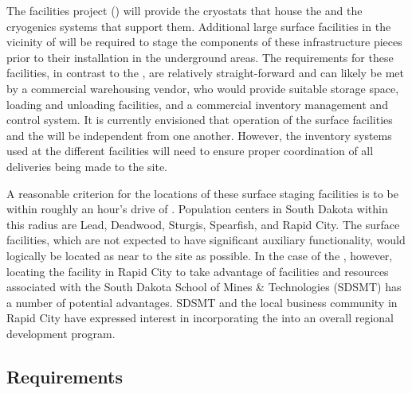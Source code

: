  The facilities project () will provide the cryostats that 
 house the  and the cryogenics
systems that support them.  Additional large surface facilities in the vicinity
of \surf will be required to stage the components of these
infrastructure pieces prior to their installation in the underground
areas.  The requirements for these facilities, in contrast to the
, are relatively straight-forward and can likely be met by
a commercial warehousing vendor, who would provide suitable storage
space, loading and unloading facilities, and a commercial inventory
management and control system.  It is currently envisioned that
operation of the  surface facilities and the 
 will be independent from one another.  However, the
inventory systems used at the different facilities will need to %
ensure proper coordination of all
deliveries being made to the \surf site.

A reasonable criterion for the locations of these surface staging
facilities is to be within roughly an hour's drive of \surf.
Population centers in South Dakota within this radius are Lead,
Deadwood, Sturgis, Spearfish, and Rapid City.  The 
surface facilities, which are not expected to have significant
auxiliary functionality, would logically be located as near to the
\surf site as possible.  In the case of the 
, however, locating the facility in Rapid City to take
advantage of facilities and resources associated with the South Dakota
School of Mines \& Technologies (SDSMT) has a number of potential
advantages.  SDSMT and the local business community in Rapid City
have expressed interest in incorporating the  
into an overall regional development program.

\subsection{Requirements}

